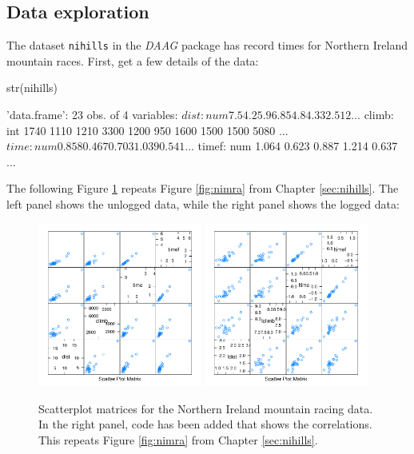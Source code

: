 \documentclass{tufte-book}\usepackage[]{graphicx}\usepackage[]{color}
\newcommand{\txtt}[1]{\texttt{#1}}
\begin{document}
\subsection*{Data exploration}

The dataset \txtt{nihills} in the {\em DAAG} package has
record times for Northern Ireland mountain races.  First, get a few
details of the data:
\begin{fullwidth}
\begin{Schunk}
\begin{Sinput}
str(nihills)
\end{Sinput}
\begin{Soutput}
'data.frame':	23 obs. of  4 variables:
 $ dist : num  7.5 4.2 5.9 6.8 5 4.8 4.3 3 2.5 12 ...
 $ climb: int  1740 1110 1210 3300 1200 950 1600 1500 1500 5080 ...
 $ time : num  0.858 0.467 0.703 1.039 0.541 ...
 $ timef: num  1.064 0.623 0.887 1.214 0.637 ...
\end{Soutput}
\end{Schunk}
\end{fullwidth}

The following Figure \ref{fig:nimra-reg} repeats Figure
\ref{fig:nimra} from Chapter \ref{sec:nihills}.
The left panel shows the unlogged data, while the
right panel shows the logged data:
\begin{figure}
\vspace*{-6pt}
\begin{Schunk}


\centerline{\includegraphics[width=0.48\textwidth]{figs/8-splot2-ni-1} \includegraphics[width=0.48\textwidth]{figs/8-splot2-ni-2} }

\end{Schunk}
\caption{Scatterplot matrices for the Northern Ireland mountain racing
  data. In the right panel, code has been added that shows the
  correlations.
This repeats Figure \ref{fig:nimra} from Chapter \ref{sec:nihills}.
\label{fig:nimra-reg}}
\end{figure}
\end{document}
